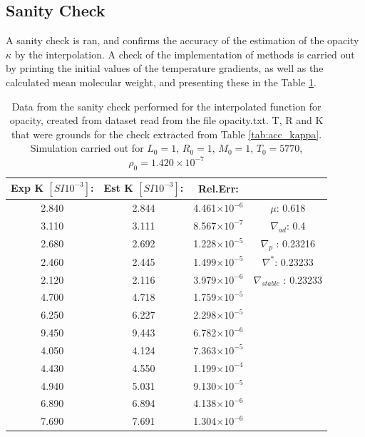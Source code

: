 \documentclass[10pt, nofootinbib, twocolumn]{revtex4-1}
\begin{document}
\subsection{Sanity Check}
A sanity check is ran, and confirms the accuracy of the estimation of the opacity $\kappa$ by the interpolation. A check of the implementation of methods is carried out by printing the initial values of the temperature gradients, as well as the calculated mean molecular weight, and presenting these in the Table \ref{tab:acc_kappa_sanity}.
\begin{center}
\begin{table}[H]
\caption{Data from the sanity check performed for the interpolated function for opacity, created from dataset read from the file opacity.txt. T, R and K that were grounds for the check extracted from Table \ref{tab:acc_kappa}. Simulation carried out for $L_0=1$, $ R_0=1$, $ M_0=1$, $ T_0=5770$, $\rho_0=1.420\times 10^{-7}$ }
    \begin{tabular*}{0.5\textwidth}{@{\extracolsep{\fill}}cccc}
    \toprule
    \textbf{Exp K $[SI 10^{-3}]$:} &  \textbf{Est K $[SI 10^{-3}]$:}  &  \textbf{Rel.Err:} & \\
    \hline 
    2.840       &  2.844     & 4.461$\times10^{-6}$  &$\mu$: 0.618  \\
    3.110      &  3.111      & 8.567$\times10^{-7}$  &$\nabla_{ad}$:         0.4 \\
    2.680        &  2.692    & 1.228$\times10^{-5}$  &$\nabla_p $ :          0.23216 \\
    2.460         &  2.445     & 1.499$\times10^{-5}$  &$\nabla^* $:           0.23233 \\
    2.120         &  2.116     & 3.979$\times10^{-6}$  &$\nabla_{stable }  $ : 0.23233 \\
    4.700        &  4.718      & 1.759$\times10^{-5}$ & \\
    6.250       &  6.227    & 2.298$\times10^{-5}$ &\\
    9.450        &  9.443    & 6.782$\times10^{-6}$ &\\
    4.050         &  4.124      & 7.363$\times10^{-5}$ &\\
    4.430      &  4.550     & 1.199$\times10^{-4}$ &\\
    4.940      &  5.031    & 9.130$\times10^{-5}$ &\\
    6.890       &  6.894     & 4.138$\times10^{-6}$ &\\
    7.690        &  7.691    & 1.304$\times10^{-6}$ &
    \end{tabular*}
    \label{tab:acc_kappa_sanity}
\end{table}
\end{center}
\end{document}
